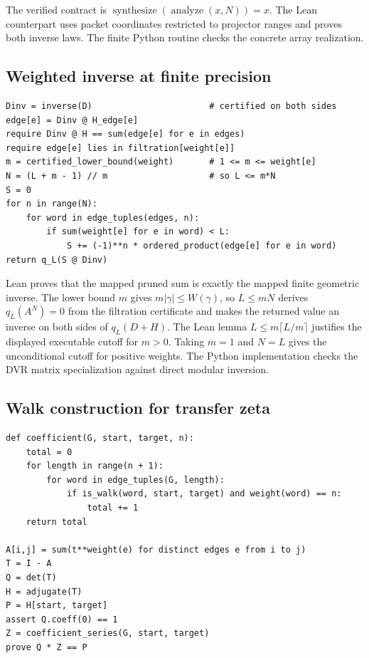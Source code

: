 The verified contract is
$\operatorname{synthesize}(\operatorname{analyze}(x,N))=x$. The Lean
counterpart uses packet coordinates restricted to projector ranges and proves
both inverse laws. The finite Python routine checks the concrete array
realization.

\subsection{Weighted inverse at finite precision}\label{alg:weighted-inverse}

\begin{lstlisting}
Dinv = inverse(D)                       # certified on both sides
edge[e] = Dinv @ H_edge[e]
require Dinv @ H == sum(edge[e] for e in edges)
require edge[e] lies in filtration[weight[e]]
m = certified_lower_bound(weight)       # 1 <= m <= weight[e]
N = (L + m - 1) // m                    # so L <= m*N
S = 0
for n in range(N):
    for word in edge_tuples(edges, n):
        if sum(weight[e] for e in word) < L:
            S += (-1)**n * ordered_product(edge[e] for e in word)
return q_L(S @ Dinv)
\end{lstlisting}

Lean proves that the mapped pruned sum is exactly the mapped finite geometric
inverse. The lower bound $m$ gives $m|\gamma|\le W(\gamma)$, so
$L\le mN$ derives $q_L(A^N)=0$ from the filtration certificate and makes the
returned value an inverse on both sides of $q_L(D+H)$. The Lean lemma
$L\le m\lceil L/m\rceil$ justifies the displayed executable cutoff for
$m>0$. Taking $m=1$ and $N=L$ gives
the unconditional cutoff for positive weights. The Python implementation checks the
DVR matrix specialization against direct modular inversion.

\subsection{Walk construction for transfer zeta}\label{alg:path-zeta}

\begin{lstlisting}
def coefficient(G, start, target, n):
    total = 0
    for length in range(n + 1):
        for word in edge_tuples(G, length):
            if is_walk(word, start, target) and weight(word) == n:
                total += 1
    return total

A[i,j] = sum(t**weight(e) for distinct edges e from i to j)
T = I - A
Q = det(T)
H = adjugate(T)
P = H[start, target]
assert Q.coeff(0) == 1
Z = coefficient_series(G, start, target)
prove Q * Z == P
\end{lstlisting}

